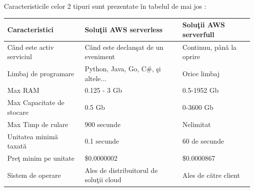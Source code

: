 \documentclass[a4paper,12pt]{report}
\begin{document}
\clearpage
\par Caracteristicile celor 2 tipuri sunt prezentate în tabelul de mai jos :
\begin{table}[h]
\begin{tabular}{|l|l|l|}
\hline
Caracteristici             & Soluţii AWS serverless                  & Soluţii AWS serverfull                          \\ \hline
Când este activ serviciul & Când este declanşat de un eveniment     & Continuu, până la oprire \\ \hline
Limbaj de programare      & Python, Java, Go, C\#,  şi altele...    & Orice limbaj                                     \\ \hline
Max RAM                   & 0.125 - 3 Gb                            & 0.5-1952 Gb                                      \\ \hline
Max Capacitate de stocare & 0.5 Gb                                  & 0-3600 Gb                                        \\ \hline
Max Timp de rulare        & 900 secunde                             & Nelimitat                                        \\ \hline
Unitatea minimă taxată    & 0.1 secunde                             & 60 de secunde                                    \\ \hline
Preţ minim pe unitate     & \$0.0000002                             & \$0.0000867                                      \\ \hline
Sistem de operare         & Ales de distribuitorul de soluţii cloud & Ales de către client                             \\ \hline
\end{tabular}
\end{table}
\end{document}
